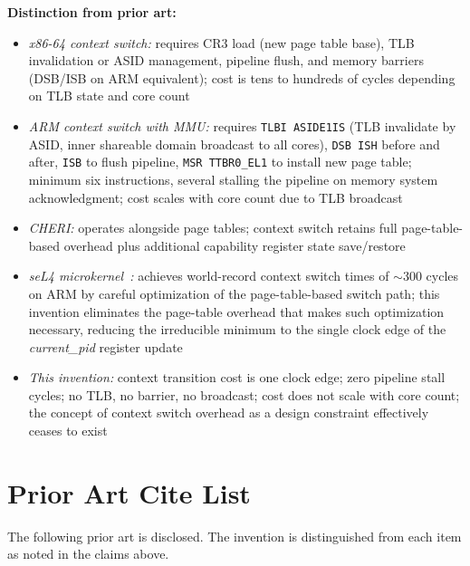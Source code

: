 \documentclass[12pt,letterpaper]{article}
\begin{document}
\textbf{Distinction from prior art:}
\begin{itemize}[noitemsep]
  \item \textit{x86-64 context switch:} requires CR3 load (new page
        table base), TLB invalidation or ASID management, pipeline
        flush, and memory barriers (DSB/ISB on ARM equivalent);
        cost is tens to hundreds of cycles depending on TLB state
        and core count

  \item \textit{ARM context switch with MMU:} requires
        \texttt{TLBI ASIDE1IS} (TLB invalidate by ASID, inner
        shareable domain broadcast to all cores), \texttt{DSB ISH}
        before and after, \texttt{ISB} to flush pipeline,
        \texttt{MSR TTBR0\_EL1} to install new page table;
        minimum six instructions, several stalling the pipeline
        on memory system acknowledgment; cost scales with core count
        due to TLB broadcast

  \item \textit{CHERI:} operates alongside page tables; context
        switch retains full page-table-based overhead plus
        additional capability register state save/restore

  \item \textit{seL4 microkernel~\cite{sel4_cacm}:} achieves
        world-record context switch times of $\sim$300 cycles on
        ARM by careful optimization of the page-table-based switch
        path; this invention eliminates the page-table overhead
        that makes such optimization necessary, reducing the
        irreducible minimum to the single clock edge of the
        \textit{current\_pid} register update

  \item \textit{This invention:} context transition cost is one
        clock edge; zero pipeline stall cycles; no TLB, no barrier,
        no broadcast; cost does not scale with core count; the
        concept of context switch overhead as a design constraint
        effectively ceases to exist
\end{itemize}

\section{Prior Art Cite List}

The following prior art is disclosed.
The invention is distinguished from each item as noted in the claims above.
\end{document}
